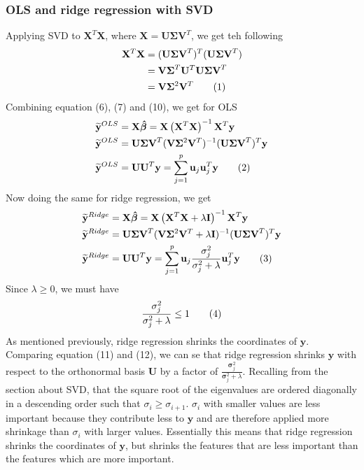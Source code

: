 \documentclass[oneside,10pt]{article}
\newcommand\numberthis{\addtocounter{equation}{1}\tag{\theequation}}
\newcommand{\y}{\mathbf{y}}
\newcommand{\ytilde}{\mathbf{\widetilde{y}}}
\newcommand{\X}{\mathbf{X}}
\newcommand{\Bhat}{\boldsymbol{\hat{\beta}}}
\begin{document}
\subsubsection{OLS and ridge regression with SVD}
Applying SVD to $\X^{T}\X$, where $\X = \mathbf{U\Sigma V}^{T}$, we get teh following
\begin{align*}
    \X^{T}\X &= (\mathbf{U\Sigma V}^{T})^{T}(\mathbf{U\Sigma V}^{T})\\
    &= \mathbf{V\Sigma}^{T}\mathbf{U}^{T}\mathbf{U\Sigma V}^{T}\\
    &= \mathbf{V}\mathbf{\Sigma}^{2}\mathbf{V}^{T}\numberthis\label{eqn}
\end{align*}
Combining equation (6), (7) and (10), we get for OLS
\begin{align*}
    \ytilde^{OLS} &= \X\Bhat = \X\left(\X^{T}\X\right)^{-1}\X^{T}\y\\
    \ytilde^{OLS} &= \mathbf{U\Sigma V}^{T}(\mathbf{V}\mathbf{\Sigma}^{2}\mathbf{V}^{T})^{-1}(\mathbf{U\Sigma V}^{T})^{T}\y\\
    \ytilde^{OLS} &= \mathbf{UU}^{T}\y = \sum_{j=1}^{p}\mathbf{u}_{j}\mathbf{u}_{j}^{T}\y \numberthis\label{eqn}
\end{align*}
Now doing the same for ridge regression, we get
\begin{align*}
        \ytilde^{Ridge} &= \X\Bhat = \X\left(\X^{T}\X + \lambda \mathbf{I}\right)^{-1}\X^{T}\y\\
    \ytilde^{Ridge} &= \mathbf{U\Sigma V}^{T}(\mathbf{V}\mathbf{\Sigma}^{2}\mathbf{V}^{T} + \lambda\mathbf{I})^{-1}(\mathbf{U\Sigma V}^{T})^{T}\y\\
    \ytilde^{Ridge} &= \mathbf{UU}^{T}\y = \sum_{j=1}^{p}\mathbf{u}_{j}\frac{\mathbf{\sigma}_{j}^{2}}{\mathbf{\sigma}_{j}^{2} + \lambda}\mathbf{u}_{j}^{T}\y \numberthis\label{eqn}
\end{align*}
Since $\lambda \geq 0$, we must have
\begin{align*}
    \frac{\mathbf{\sigma}_{j}^{2}}{\mathbf{\sigma}_{j}^{2} + \lambda} \leq 1 \numberthis\label{eqn}
\end{align*}
As mentioned previously, ridge regression shrinks the coordinates of $\y$. Comparing equation (11) and (12), we can se that ridge regression shrinks $\y$ with respect to the orthonormal basis $\mathbf{U}$ by a factor of $\frac{\mathbf{\sigma}_{j}^{2}}{\mathbf{\sigma}_{j}^{2} + \lambda}$. Recalling from the section about SVD, that the square root of the eigenvalues are ordered diagonally in a descending order such that $\sigma_{i} \geq \sigma_{i+1}$. $\sigma_{i}$ with smaller values are less important because they contribute less to $\y$ and are therefore applied more shrinkage than $\sigma_{i}$ with larger values. Essentially this means that ridge regression shrinks the coordinates of $\y$, but shrinks the features that are less important than the features which are more important.
\end{document}
